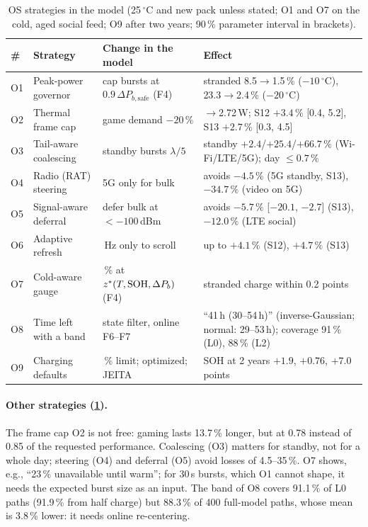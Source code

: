 \begin{table}[t]\centering\footnotesize
\caption{OS strategies in the model (25\,$^\circ$C and new pack unless stated; O1 and O7 on the cold, aged social
feed; O9 after two years; 90\,\% parameter interval in brackets).}
\label{tab:os}
\setlength{\tabcolsep}{4pt}
\begin{tabularx}{\textwidth}{@{}l>{\raggedright\arraybackslash}p{2.95cm}>{\raggedright\arraybackslash}p{4.0cm}>{\raggedright\arraybackslash}X@{}}
\toprule
\# & Strategy & Change in the model & Effect \\
\midrule
O1 & Peak-power governor & cap bursts at $0.9\,\Delta P_{b,\mathrm{safe}}$ (F4) & stranded 8.5$\to$1.5\,\%
($-10\,^\circ$C), 23.3$\to$2.4\,\% ($-20\,^\circ$C) \\
O2 & Thermal frame cap & game demand $-20\,\%$ & 3.12$\to$2.72\,W; S12 $+3.4\,\%$ [0.4, 5.2], S13
$+2.7\,\%$ [0.3, 4.5] \\
O3 & Tail-aware coalescing & standby bursts $\lambda/5$ \cite{HU12,NA21} & standby $+2.4$/$+25.4$/$+66.7\,\%$
(Wi-Fi/LTE/5G); day $\le0.7\,\%$ \\
O4 & Radio (RAT) steering & 5G only for bulk \cite{XU20} & avoids $-4.5\,\%$ (5G standby, S13), $-34.7\,\%$ (video on 5G) \\
O5 & Signal-aware deferral & defer bulk at ${<}{-100}$\,dBm \cite{DI13} & avoids $-5.7\,\%$ [$-20.1$, $-2.7$] (S13),
$-12.0\,\%$ (LTE social) \\
O6 & Adaptive refresh & 120\,Hz only to scroll \cite{AT20} & up to $+4.1\,\%$ (S12), $+4.7\,\%$ (S13) \\
O7 & Cold-aware gauge & 0\,\% at $z^*(T,\mathrm{SOH},\Delta P_b)$ (F4) & stranded charge within 0.2 points \\
O8 & Time left with a band & state filter, online F6--F7 & ``41\,h (30--54\,h)'' (inverse-Gaussian; normal: 29--53\,h); coverage
91\,\% (L0), 88\,\% (L2) \\
O9 & Charging defaults & 80\,\% limit; optimized; JEITA & SOH at 2 years $+1.9$, $+0.76$, $+7.0$ points \\
\bottomrule
\end{tabularx}
\end{table}

\paragraph{Other strategies (\cref{tab:os}).} The frame cap O2 is not free: gaming lasts 13.7\,\% longer, but at
0.78 instead of 0.85 of the requested performance. Coalescing (O3) matters for standby, not for a whole day;
steering (O4) and deferral (O5) avoid losses of 4.5--35\,\%. O7 shows, e.g., ``23\,\% unavailable until warm'';
for 30\,s bursts, which O1 cannot shape, it needs the expected burst size as an input. The band of O8 covers
91.1\,\% of L0 paths (91.9\,\% from half charge) but 88.3\,\% of 400 full-model paths, whose mean is 3.8\,\%
lower: it needs online re-centering.

